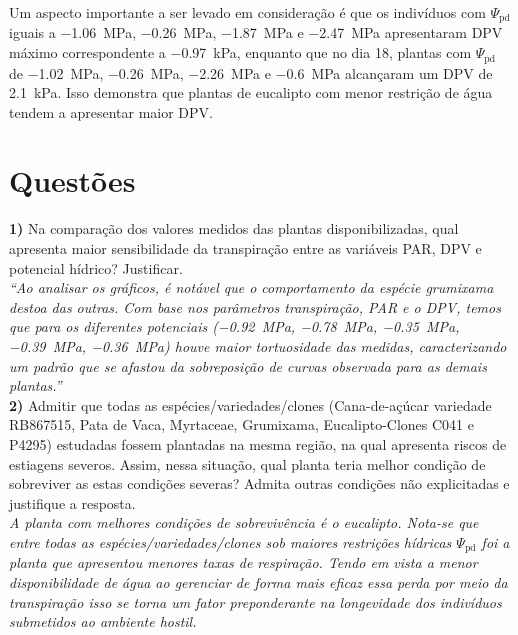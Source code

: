 \documentclass[a4paper, 12pt]{article}
\begin{document}
	Um aspecto importante a ser levado em consideração é que os indivíduos com $\Psi_{\textrm{pd}}$ iguais a \SI{-1.06}{\mega\pascal}, \SI{-.26}{\mega\pascal}, \SI{-1.87}{\mega\pascal} e \SI{-2.47}{\mega\pascal} apresentaram DPV máximo correspondente a \SI{-.97}{\kilo\pascal}, enquanto que no dia 18, plantas com $\Psi_{\textrm{pd}}$ de \SI{-1.02}{\mega\pascal}, \SI{-.26}{\mega\pascal}, \SI{-2.26}{\mega\pascal} e \SI{-.6}{\mega\pascal} alcançaram um DPV de \SI{2.1}{\kilo\pascal}. Isso demonstra que plantas de eucalipto com menor restrição de água tendem a apresentar maior DPV.  
	
	
	\section{Questões}
	\noindent\textbf{1)} Na comparação dos valores medidos das plantas disponibilizadas, qual apresenta maior sensibilidade da transpiração entre as variáveis PAR, DPV e potencial hídrico? Justificar.\\
	
	\noindent\textit{``Ao analisar os gráficos, é notável que o comportamento da espécie grumixama destoa das outras. Com base nos parâmetros transpiração, PAR e o DPV, temos que para os diferentes potenciais (\SI{-.92}{\mega\pascal}, \SI{-.78}{\mega\pascal}, \SI{-.35}{\mega\pascal}, \SI{-.39}{\mega\pascal}, \SI{-.36}{\mega\pascal}) houve maior tortuosidade das medidas, caracterizando um padrão que se afastou da sobreposição de curvas observada para as demais plantas.''}\\
	
	\noindent\textbf{2)} Admitir que todas as espécies/variedades/clones (Cana-de-açúcar variedade RB867515, Pata de Vaca, Myrtaceae, Grumixama, Eucalipto-Clones C041 e P4295) estudadas fossem plantadas na mesma região, na qual apresenta riscos de estiagens severos. Assim, nessa situação, qual planta teria melhor condição de sobreviver as estas condições severas? Admita outras condições não explicitadas e justifique a resposta.\\
	
	\noindent\textit{A planta com melhores condições de sobrevivência é o eucalipto. Nota-se que entre todas as espécies/variedades/clones sob maiores restrições hídricas $\Psi_{\textrm{pd}}$ foi a planta que apresentou menores taxas de respiração. Tendo em vista a menor disponibilidade de água ao gerenciar de forma mais eficaz essa perda por meio da transpiração isso se torna um fator preponderante na longevidade dos indivíduos submetidos ao ambiente hostil.}
	
\end{document}
